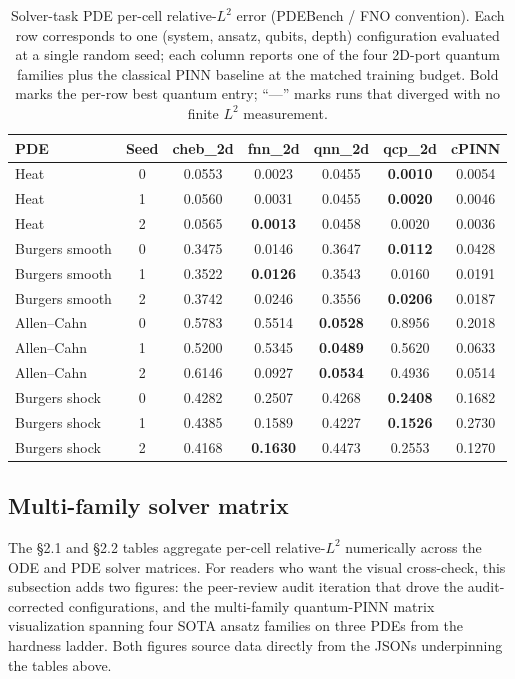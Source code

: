 \documentclass[%
  prx,
  amsmath,
  amssymb,
  aps,
  reprint,
  superscriptaddress,
  floatfix,
]{revtex4-2}
\newcommand{\ac}{Allen--Cahn}
\begin{document}
\begin{table}[t]
\centering
\caption{Solver-task PDE per-cell relative-$L^2$ error
(PDEBench / FNO convention). Each row corresponds to one
(system, ansatz, qubits, depth) configuration evaluated at a
single random seed; each column reports one of the four
2D-port quantum families plus the classical PINN baseline at
the matched training budget. Bold marks the per-row best
quantum entry; ``---'' marks runs that diverged with no finite
$L^2$ measurement.}
\label{sup:tab:solver-pde}
\footnotesize
\setlength{\tabcolsep}{4pt}
\begin{tabular}{lc|cccc|c}
\toprule
PDE & Seed & cheb\_2d & fnn\_2d & qnn\_2d & qcp\_2d & cPINN \\
\midrule
Heat & 0 & 0.0553 & 0.0023 & 0.0455 & \textbf{0.0010} & 0.0054 \\
Heat & 1 & 0.0560 & 0.0031 & 0.0455 & \textbf{0.0020} & 0.0046 \\
Heat & 2 & 0.0565 & \textbf{0.0013} & 0.0458 & 0.0020 & 0.0036 \\
Burgers smooth & 0 & 0.3475 & 0.0146 & 0.3647 & \textbf{0.0112} & 0.0428 \\
Burgers smooth & 1 & 0.3522 & \textbf{0.0126} & 0.3543 & 0.0160 & 0.0191 \\
Burgers smooth & 2 & 0.3742 & 0.0246 & 0.3556 & \textbf{0.0206} & 0.0187 \\
\ac{} & 0 & 0.5783 & 0.5514 & \textbf{0.0528} & 0.8956 & 0.2018 \\
\ac{} & 1 & 0.5200 & 0.5345 & \textbf{0.0489} & 0.5620 & 0.0633 \\
\ac{} & 2 & 0.6146 & 0.0927 & \textbf{0.0534} & 0.4936 & 0.0514 \\
Burgers shock & 0 & 0.4282 & 0.2507 & 0.4268 & \textbf{0.2408} & 0.1682 \\
Burgers shock & 1 & 0.4385 & 0.1589 & 0.4227 & \textbf{0.1526} & 0.2730 \\
Burgers shock & 2 & 0.4168 & \textbf{0.1630} & 0.4473 & 0.2553 & 0.1270 \\
\bottomrule
\end{tabular}
\end{table}

\subsection{Multi-family solver matrix}
\label{sup:multi-family-solver}

The \S2.1 and \S2.2 tables aggregate per-cell relative-$L^2$
numerically across the ODE and PDE solver matrices. For readers who
want the visual cross-check, this subsection adds two figures: the
peer-review audit iteration that drove the audit-corrected
configurations, and the multi-family quantum-PINN matrix
visualization spanning four SOTA ansatz families on three PDEs from
the hardness ladder. Both figures source data directly from the
JSONs underpinning the tables above.
\end{document}
